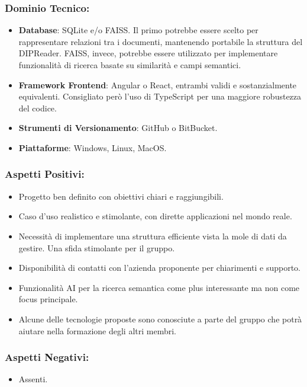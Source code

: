 \documentclass[a4paper,12pt]{article}
\begin{document}
\subsubsection*{Dominio Tecnico:}
\begin{itemize}
    \item \textbf{Database}: SQLite e/o FAISS. Il primo potrebbe essere scelto per rappresentare relazioni tra i documenti, mantenendo portabile la struttura del DIPReader. FAISS, invece, potrebbe essere utilizzato per implementare funzionalità di ricerca basate su similarità e campi semantici.
    \item \textbf{Framework Frontend}: Angular o React, entrambi validi e sostanzialmente equivalenti. Consigliato però l'uso di TypeScript per una maggiore robustezza del codice.
    \item \textbf{Strumenti di Versionamento}: GitHub o BitBucket.
    \item \textbf{Piattaforme}: Windows, Linux, MacOS.
\end{itemize}
\subsubsection*{Aspetti Positivi:}
\begin{itemize}
    \item Progetto ben definito con obiettivi chiari e raggiungibili.
    \item Caso d'uso realistico e stimolante, con dirette applicazioni nel mondo reale.
    \item Necessità di implementare una struttura efficiente vista la mole di dati da gestire. Una sfida stimolante per il gruppo.
    \item Disponibilità di contatti con l'azienda proponente per chiarimenti e supporto.
    \item Funzionalità AI per la ricerca semantica come plus interessante ma non come focus principale.
    \item Alcune delle tecnologie proposte sono conosciute a parte del gruppo che potrà aiutare nella formazione degli altri membri.
\end{itemize}

\subsubsection*{Aspetti Negativi:}
\begin{itemize}
    \item Assenti.
\end{itemize}
\end{document}
